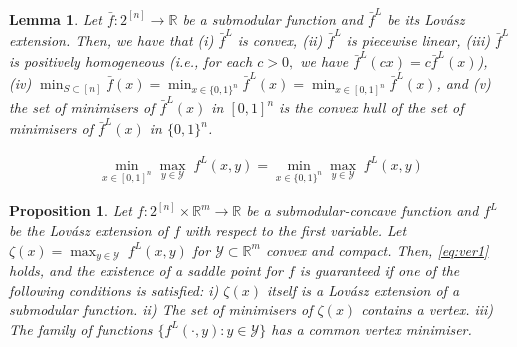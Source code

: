 \documentclass[10pt,a4paper]{amsart}
\newtheorem{proposition}{Proposition}
\newtheorem{lemma}{Lemma}
\newcommand{\R}{\mathbb{R}}
\begin{document}
\begin{lemma}\label{lm:lmlova}
    Let $\bar{f}:2^{[n]}\rightarrow \mathbb{R}$ be a submodular function and $\bar{f}^L$ be its Lovász extension. Then, we have that (i) $\bar{f}^L$ is convex, (ii) $\bar{f}^L$ is piecewise linear,  (iii) $\bar{f}^L$ is positively homogeneous (i.e., for each $c>0,$ we have $\bar{f}^L(cx)=c\bar{f}^L(x)$),  (iv) $\min_{S\subset[n]} \bar{f}(x) = \min_{x\in\{0,1\}^n} \bar{f}^L(x)=\min_{x\in[0,1]^n} \bar{f}^L(x)$, and (v) the set of minimisers of $\bar{f}^L(x)$ in $[0,1]^n$ is the convex hull of the set of minimisers of $\bar{f}^L(x)$ in $\{0,1\}^n$. 
\end{lemma}

\begin{align}\label{eq:ver}
    \underset{x \in [0,1]^n}{\min}\underset{y \in \mathcal{Y}}{\max}\;f^L(x,y)=\underset{x \in \{0,1\}^n}{\min}\underset{y \in \mathcal{Y}}{\max}\;f^L(x,y)
\end{align}

\begin{proposition}\label{Prp:sadex}
    Let $f:2^{[n]}\times\R^m\rightarrow \mathbb{R}$ be a submodular-concave function and $f^L$ be the Lovász extension of $f$ with respect to the first variable. Let 
    $\zeta(x) = \max_{y \in \mathcal{Y}}\;f^L(x,y)$ 
    for $\mathcal{Y}\subset \R^m$ convex and compact. Then, \eqref{eq:ver1} %
    holds, and the existence of a saddle point for $f$ is guaranteed if one of the following conditions is satisfied: i)  $\zeta(x)$ itself is a Lovász extension of a submodular function. ii) The set of minimisers of $\zeta(x)$ contains a vertex. iii) The family of functions $\{f^L(\cdot,y):y\in\mathcal{Y}\}$ has a common
    vertex minimiser.
\end{proposition}
\end{document}
